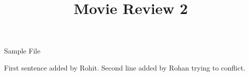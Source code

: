 \documentclass{article}
\begin{document}
\centerline{\sc \large Sample File}
\vspace{.5pc}
\centerline{\sc }
\vspace{2pc}
\title{Movie Review 2}

First sentence added by Rohit.
Second line added by Rohan trying to conflict.
\end{document}
